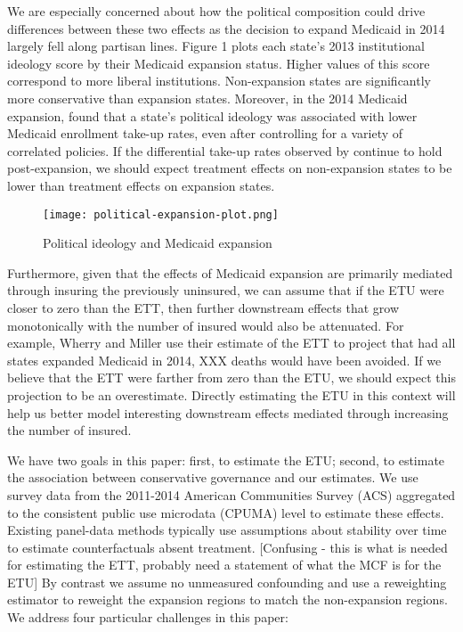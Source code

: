 \documentclass[final]{article}
\begin{document}
We are especially concerned about how the political composition could drive differences between these two effects as the decision to expand Medicaid in 2014 largely fell along partisan lines. Figure 1 plots each state's 2013 institutional ideology score by their Medicaid expansion status. Higher values of this score correspond to more liberal institutions. Non-expansion states are significantly more conservative than expansion states. Moreover, in the 2014 Medicaid expansion, \cite{sommers2012understanding} found that a state's political ideology was associated with lower Medicaid enrollment take-up rates, even after controlling for a variety of correlated policies. If the differential take-up rates observed by \cite{sommers2012understanding} continue to hold post-expansion, we should expect treatment effects on non-expansion states to be lower than treatment effects on expansion states. 

\begin{figure}
    \texttt{[image: political-expansion-plot.png]}
    \caption{Political ideology and Medicaid expansion}
\end{figure}

Furthermore, given that the effects of Medicaid expansion are primarily mediated through insuring the previously uninsured, we can assume that if the ETU were closer to zero than the ETT, then further downstream effects that grow monotonically with the number of insured would also be attenuated. For example, Wherry and Miller use their estimate of the ETT to project that had all states expanded Medicaid in 2014, XXX deaths would have been avoided. If we believe that the ETT were farther from zero than the ETU, we should expect this projection to be an overestimate. Directly estimating the ETU in this context will help us better model interesting downstream effects mediated through increasing the number of insured.

We have two goals in this paper: first, to estimate the ETU; second, to estimate the association between conservative governance and our estimates. We use survey data from the 2011-2014 American Communities Survey (ACS) aggregated to the consistent public use microdata (CPUMA) level to estimate these effects. Existing panel-data methods typically use assumptions about stability over time to estimate counterfactuals absent treatment. [Confusing - this is what is needed for estimating the ETT, probably need a statement of what the MCF is for the ETU] By contrast we assume no unmeasured confounding and use a reweighting estimator to reweight the expansion regions to match the non-expansion regions. We address four particular challenges in this paper: 
\end{document}
